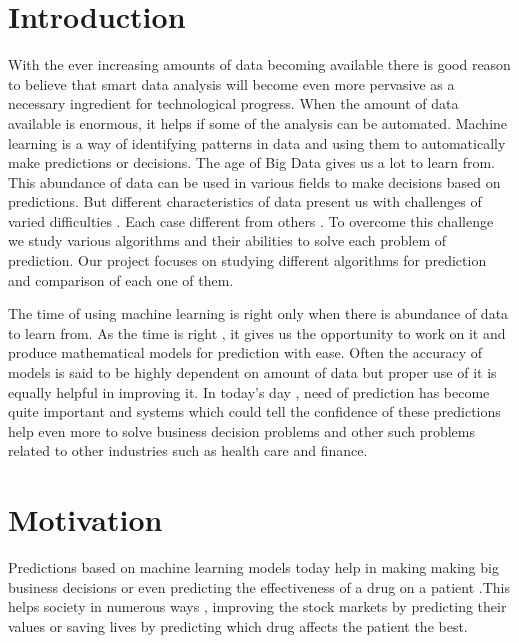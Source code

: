 \documentclass[12pt,times,a4paper]{report}
\begin{document}
{{\section{Introduction }
\begin{normalsize}
\par
With the ever increasing amounts of data becoming
available there is good reason to believe that smart data analysis will become
even more pervasive as a necessary ingredient for technological progress. 
When the amount of data available is enormous, it helps if some of the analysis can be automated. Machine learning is a way of identifying patterns in data and using them to automatically make predictions or decisions. 
The age of Big Data gives us a lot to learn from. This abundance of data can be used in various fields to make decisions based on predictions. But different characteristics of data present us with challenges of varied difficulties . Each case different from others . To overcome 
this challenge we study various algorithms and their abilities to solve each problem of prediction. Our project focuses on studying different algorithms for prediction and comparison of each one of them. 
\par
The time of using machine learning is right only when there is abundance of data to learn from. As the time is right , it gives us the opportunity to work on it and produce mathematical models for prediction with ease. Often the accuracy of models is said to be highly dependent on amount of data but proper use of it is equally helpful in improving it. In today's day , need of prediction  has become quite important and systems which could tell the confidence of these predictions help even more to solve business decision problems and other such problems related to other industries such as health care and finance.
\newpage
\section{Motivation}

Predictions based on machine learning models today help in making making big business decisions or even predicting the effectiveness of a drug on a patient .This helps society in numerous ways , improving the stock markets by predicting their values or saving lives by predicting which drug affects the patient the best.

\end{normalsize}}}
\end{document}
